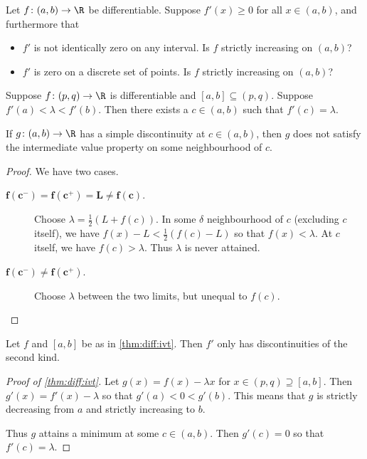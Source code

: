 \begin{exercise}
    Let $f\colon (a, b) \to \R$ be differentiable.
    Suppose $f'(x) \ge 0$ for all $x \in (a, b)$, and furthermore that
    \begin{itemize}
        \item $f'$ is not identically zero on any interval.
        Is $f$ strictly increasing on $(a, b)$?
        \item $f'$ is zero on a discrete set of points.
        Is $f$ strictly increasing on $(a, b)$?
    \end{itemize}
\end{exercise}

\begin{theorem} \label{thm:diff:ivt}
    Suppose $f\colon (p, q) \to \R$ is differentiable and
    $[a, b] \subseteq (p, q)$.
    Suppose $f'(a) < \lambda < f'(b)$.
    Then there exists a $c \in (a, b)$ such that $f'(c) = \lambda$.
\end{theorem}

\begin{exercise}
    If $g\colon (a, b) \to \R$ has a simple discontinuity at $c \in (a, b)$,
    then $g$ does not satisfy the intermediate value property on some
    neighbourhood of $c$.
\end{exercise}
\begin{proof}
    We have two cases.
    \begin{description}
        \item[$\bm{f(c^-) = f(c^+) = L \ne f(c)}$.]
        Choose $\lambda = \frac12 (L + f(c))$.
        In some $\delta$ neighbourhood of $c$ (excluding $c$ itself),
        we have $f(x) - L < \frac12 (f(c) - L)$ so that
        $f(x) < \lambda$.
        At $c$ itself, we have $f(c) > \lambda$.
        Thus $\lambda$ is never attained.
        \item[$\bm{f(c^-) \ne f(c^+)}$.]
        Choose $\lambda$ between the two limits, but unequal to $f(c)$.
        \qedhere
    \end{description}
\end{proof}

\begin{corollary}
    Let $f$ and $[a, b]$ be as in \cref{thm:diff:ivt}.
    Then $f'$ only has discontinuities of the second kind.
\end{corollary}

\begin{proof}[Proof of \cref{thm:diff:ivt}]
    Let $g(x) = f(x) - \lambda x$ for $x \in (p, q) \supseteq [a, b]$.
    Then $g'(x) = f'(x) - \lambda$ so that $g'(a) < 0 < g'(b)$.
    This means that $g$ is strictly decreasing from $a$
    and strictly increasing to $b$.

    Thus $g$ attains a minimum at some $c \in (a, b)$.
    Then $g'(c) = 0$ so that $f'(c) = \lambda$.
\end{proof}

